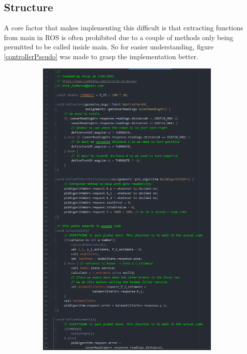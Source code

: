 \documentclass{article}
\begin{document}
\subsection{Structure}
A core factor that makes implementing this difficult is that extracting functions
from main in ROS is often prohibited due to a couple of methods only being
permitted to be called inside main. So for easier understanding, figure
\ref{controllerPseudo} was made to grasp the implementation better.
\begin{figure}[ht]
    \begin{subfigure}{.5\textwidth}
        \centering
        \includegraphics[scale=0.25]{img/pseudocode_1.png}

\end{subfigure}
\end{figure}
\end{document}
